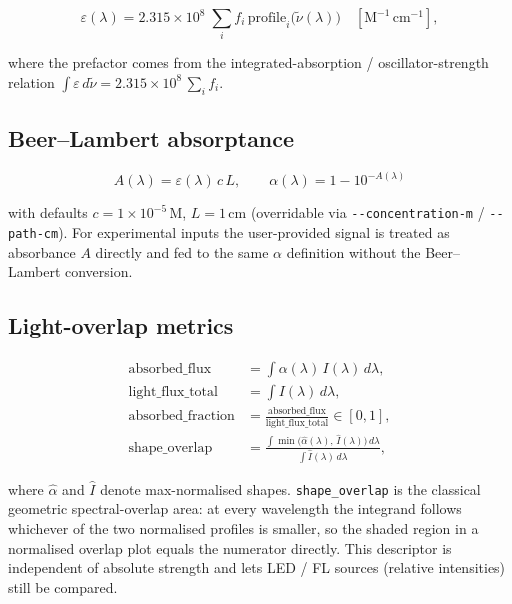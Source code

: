 \documentclass[11pt,a4paper]{article}
\begin{document}
\begin{equation}
\varepsilon(\lambda) = 2.315\times 10^{8}\;
  \sum_i f_i\, \text{profile}_i\!\bigl(\tilde\nu(\lambda)\bigr)
  \quad [\text{M}^{-1}\,\text{cm}^{-1}],
\end{equation}

where the prefactor comes from the integrated-absorption /
oscillator-strength relation
\(\int \varepsilon\,d\tilde\nu = 2.315\times 10^{8}\,\sum_i f_i\).

\subsection{Beer--Lambert absorptance}

\begin{equation}
A(\lambda) = \varepsilon(\lambda)\,c\,L,\qquad
\alpha(\lambda) = 1 - 10^{-A(\lambda)}
\end{equation}

with defaults \(c = 1\times 10^{-5}\,\text{M}\), \(L = 1\,\text{cm}\)
(overridable via \texttt{-{}-concentration-m} / \texttt{-{}-path-cm}).
For experimental inputs the user-provided signal is treated as
absorbance \(A\) directly and fed to the same \(\alpha\) definition
without the Beer--Lambert conversion.

\subsection{Light-overlap metrics}

\begin{align}
\text{absorbed\_flux}      &= \int \alpha(\lambda)\,I(\lambda)\,d\lambda, \\
\text{light\_flux\_total}  &= \int I(\lambda)\,d\lambda, \\
\text{absorbed\_fraction}  &= \frac{\text{absorbed\_flux}}{\text{light\_flux\_total}} \in [0,1], \\
\text{shape\_overlap}      &= \frac{\displaystyle\int \min\!\bigl(\hat\alpha(\lambda),\,\hat I(\lambda)\bigr)\,d\lambda}
                                   {\displaystyle\int \hat I(\lambda)\,d\lambda},
\end{align}

where \(\hat\alpha\) and \(\hat I\) denote max-normalised shapes.
\texttt{shape\_overlap} is the classical geometric spectral-overlap
area: at every wavelength the integrand follows whichever of the two
normalised profiles is smaller, so the shaded region in a normalised
overlap plot equals the numerator directly. This descriptor is
independent of absolute strength and lets LED / FL sources (relative
intensities) still be compared.
\end{document}
